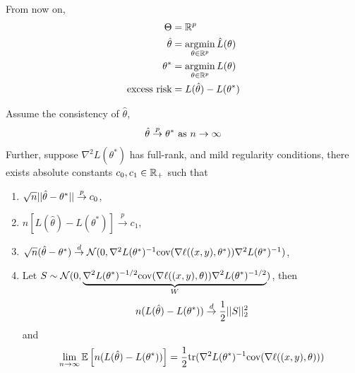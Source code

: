 \documentclass[11pt]{article}
\newcommand{\thetahat}[0]{\hat{\theta}}
\newcommand{\convp}[0]{\overset{p}{\rightarrow}}
\newcommand{\convd}[0]{\overset{d}{\rightarrow}}
\newcommand{\inv}[0]{^{-1}}
\newcommand{\cov}[0]{\text{cov}}
\newcommand{\tr}[0]{\text{tr}}
\begin{document}
	From now on,
	\begin{align}
		\Theta &= \R^p \\
		\thetahat &= \argmin_{\theta \in \R^p} \hat{L}(\theta) \\
		\theta^* &= \argmin_{\theta \in \R^p} L(\theta) \\
		\tx{excess risk} &= L(\thetahat) - L(\theta^*)
	\end{align}

	\begin{theorem}
		\label{thm:1}
		Assume the consistency of $\hat{\theta}$, 
		\begin{align}
			\thetahat \convp \theta^* \tx{ as } n \to \infty
		\end{align}
		Further, suppose $\nabla^2L(\theta^*)$ has full-rank, and mild regularity conditions, there exists absolute constants $c_0, c_1 \in \mathbb{R}_+$ such that
		\begin{enumerate}
			\item $\sqrt{n} \norm{\thetahat - \theta^*} \convp c_0$,
			\item $n[L(\thetahat) - L(\theta^*)] \convp c_1$,
			\item $\sqrt{n} (\thetahat - \theta^*) \convd \mc{N}(0, \nabla^2L(\theta^*)\inv \cov(\nabla \ell((x,y),\theta^*)) \nabla^2L(\theta^*)\inv)$,
			\item Let $S \sim \mc{N}(0, \underbrace{\nabla^2 L(\theta^*)^{-1/2} \cov(\nabla \ell((x,y),\theta)) \nabla^2 L(\theta^*)^{-1/2}}_{W})$,
			then $$n(L(\thetahat) - L(\theta^*)) \convd \frac{1}{2} \norm{S}_2^2$$
			and $$\lim_{n \to \infty} \expect{n(L(\thetahat) - L(\theta^*))} = \frac{1}{2} \tr(\nabla^2 L(\theta^*)^{-1} \cov(\nabla \ell((x,y),\theta))) $$
		\end{enumerate}
	\end{theorem}
\end{document}
